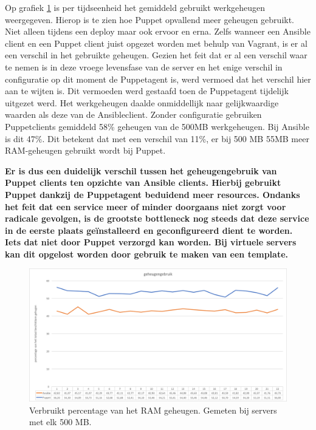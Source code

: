 Op grafiek \ref{fig:geheugengebruik} is per tijdseenheid het gemiddeld gebruikt werkgeheugen weergegeven. Hierop is te zien hoe Puppet opvallend meer geheugen gebruikt. Niet alleen tijdens een \gls{deploy} maar ook ervoor en erna. Zelfs wanneer een Ansible client en een Puppet client juist opgezet worden met behulp van Vagrant, is er al een verschil in het gebruikte geheugen. Gezien het feit dat er al een verschil waar te nemen is in deze vroege levensfase van de server en het enige verschil in configuratie op dit moment de Puppetagent is, werd vermoed dat het verschil hier aan te wijten is. Dit vermoeden werd gestaafd toen de Puppetagent tijdelijk uitgezet werd. Het werkgeheugen daalde onmiddellijk naar gelijkwaardige waarden als deze van de Ansibleclient. Zonder configuratie gebruiken Puppetclients gemiddeld 58\% geheugen van de 500MB werkgeheugen. Bij Ansible is dit 47\%. Dit betekent dat met een verschil van 11\%, er bij 500 MB 55MB meer RAM-geheugen gebruikt wordt bij Puppet.

\textbf{Er is dus een duidelijk verschil tussen het geheugengebruik van Puppet clients ten opzichte van Ansible clients. Hierbij gebruikt Puppet dankzij de Puppetagent beduidend meer resources. Ondanks het feit dat een service meer of minder doorgaans niet zorgt voor radicale gevolgen, is de grootste bottleneck nog steeds dat deze service in de eerste plaats ge\"installeerd en geconfigureerd dient te worden. Iets dat niet door Puppet verzorgd kan worden. Bij virtuele servers kan dit opgelost worden door gebruik te maken van een template.}



\begin{figure}[hbt!]
  \includegraphics[width=\linewidth]{img/geheugengebruik}
 \caption{Verbruikt percentage van het RAM geheugen. Gemeten bij servers met elk 500 MB. }  
  \label{fig:geheugengebruik}
\end{figure}

